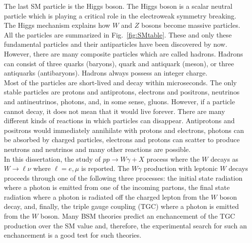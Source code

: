 The last SM particle is the Higgs boson. The Higgs boson is a scalar neutral particle which is playing a critical role in the electroweak symmetry breaking. The Higgs mechanism explains how $W$ and $Z$ bosons become massive particles.\\

All the particles are summarized in Fig.~\ref{fig:SMtable}. These and only these fundamental particles and their antiparticles have been discovered by now. However, there are many composite particles which are called hadrons. Hadrons can consist of three quarks (baryons), quark and antiquark (meson), or three antiquarks (antibaryons). Hadrons always possess an integer charge.\\

Most of the particles are short-lived and decay within microseconds. The only stable particles are protons and antiprotons, electrons and positrons, neutrinos and antineutrinos, photons, and, in some sense, gluons. However, if a particle cannot decay, it does not mean that it would live forever. There are many different kinds of reactions in which particles can disappear. Antiprotons and positrons would immediately annihilate with protons and electrons, photons can be absorbed by charged particles, electrons and protons can scatter to produce neutrons and neutrinos and many other reactions are possible.\\ 

In this dissertation, the study of $pp\rightarrow W\gamma + X$ process where the $W$ decays as $W\to \ell\nu$ where $\ell = e, \mu$ is reported. The $W\gamma$ production with leptonic $W$ decays proceeds through one of the following three processes: the initial state radiation where a photon is emitted from one of the incoming partons, the final state radiation where a photon is radiated off the charged lepton from the $W$ boson decay, and, finally, the triple gauge coupling (TGC) where a photon is emitted from the $W$ boson. Many BSM theories predict an enchancement of the TGC production over the SM value and, therefore, the experimental search for such an enchancement is a good test for such theories.\\ 

